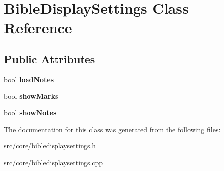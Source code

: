 \hypertarget{classBibleDisplaySettings}{
\section{BibleDisplaySettings Class Reference}
\label{classBibleDisplaySettings}
}
\subsection*{Public Attributes}
\begin{DoxyCompactItemize}
\item 
\hypertarget{classBibleDisplaySettings_aa2154422fa031aa41b2773a718cb7729}{
bool {\bfseries loadNotes}}
\label{classBibleDisplaySettings_aa2154422fa031aa41b2773a718cb7729}

\item 
\hypertarget{classBibleDisplaySettings_aab18301f62ed65fe14c6be9e3c740777}{
bool {\bfseries showMarks}}
\label{classBibleDisplaySettings_aab18301f62ed65fe14c6be9e3c740777}

\item 
\hypertarget{classBibleDisplaySettings_ad84153fd4c3678846d17481d5730c2b7}{
bool {\bfseries showNotes}}
\label{classBibleDisplaySettings_ad84153fd4c3678846d17481d5730c2b7}

\end{DoxyCompactItemize}


The documentation for this class was generated from the following files:\begin{DoxyCompactItemize}
\item 
src/core/bibledisplaysettings.h\item 
src/core/bibledisplaysettings.cpp\end{DoxyCompactItemize}

